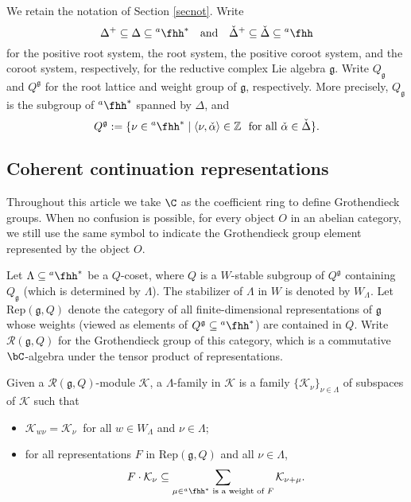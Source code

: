 \documentclass[12pt]{amsart}
\def\subset{\subseteq}
\newcommand{\CK}{{\mathcal {K}}}
\newcommand{\g}{\mathfrak g}
\newcommand{\Z}{\mathbb{Z}}
\numberwithin{equation}{section}
\theoremstyle{remark}
\def\hha{{}^a\fhh}
\begin{document}

We retain the notation of Section \ref{secnot}.
Write \[
\Delta^+\subset \Delta\subset \hha^*\quad \textrm{and}\quad \check \Delta^+\subset \check \Delta\subset \hha
\]
for the positive root system, the root system, the positive coroot system, and the coroot system, respectively, for the reductive complex Lie algebra $\g$.
Write $Q_\g$ and $ Q^\g$ for the root lattice and weight group of $\g$, respectively. More precisely, $Q_\g$ is the subgroup of $\hha^*$   spanned by $\Delta$, and
\[
Q^\g:=\{\nu\in \hha^*\mid \langle \nu, \check \alpha\rangle \in \Z\ \textrm{ for all }\check \alpha\in \check \Delta\}.
\]


\subsection{Coherent continuation representations}\label{subsec:coherent}

 Throughout this article we take $\C$ as the coefficient ring to define  Grothendieck groups. When no confusion is possible, for every object $O$ in an abelian category, we  still use the same symbol to indicate the Grothendieck group element represented by the object $O$.




 Let $\Lambda\subset \hha^*$ be a $Q$-coset, where $Q$ is a $W$-stable subgroup of $Q^\g$ containing $Q_\g$ (which is determined by $\Lambda$).
The stabilizer of $\Lambda$ in $W$ is denoted by $W_\Lambda$. Let $\mathrm{Rep}(\g, Q)$ denote the category of all finite-dimensional
representations of $\g$ whose weights
(viewed
as elements of $Q^\g\subset \hha^*$) are contained in $Q$. Write $\mathcal R(\g, Q)$ for the Grothendieck group of this category, which is
 a commutative $\bC$-algebra under the tensor
product of representations.

 Given  a $\mathcal R(\g, Q)$-module $\CK$, a  $\Lambda$-family in $\CK$ is a family
   $\{\CK_\nu\}_{\nu\in \Lambda}$ of subspaces of $\CK$ such that
\begin{itemize}
\item
  $\CK_{w \nu}=\CK_\nu\ $  for all $w\in W_\Lambda$ and $\nu\in \Lambda$;
  \item  for all representations $F$ in  $\mathrm{Rep}(\g, Q)$ and all $\nu\in \Lambda$,
  \[
   F\cdot \CK_\nu\subset \sum_{\mu\in \hha^* \textrm{ is a weight of $F$} } \CK_{\nu+\mu}.
  \]
 \end{itemize}
\end{document}
